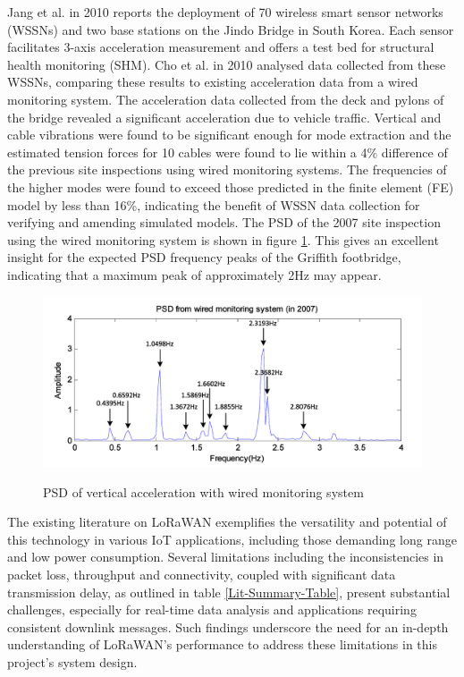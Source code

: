 Jang et al. in 2010 \cite{SHM-Korea} reports the deployment of 70 wireless smart sensor networks (WSSNs) and two base stations on the Jindo Bridge in South Korea. Each sensor facilitates 3-axis acceleration measurement and offers a test bed for structural health monitoring (SHM). Cho et al. in 2010 \cite{WSSN-Korean-Bridge} analysed data collected from these WSSNs, comparing these results to existing acceleration data from a wired monitoring system. The acceleration data collected from the deck and pylons of the bridge revealed a significant acceleration due to vehicle traffic. Vertical and cable vibrations were found to be significant enough for mode extraction and the estimated tension forces for 10 cables were found to lie within a 4\% difference of the previous site inspections using wired monitoring systems. The frequencies of the higher modes were found to exceed those predicted in the finite element (FE) model by less than 16\%, indicating the benefit of WSSN data collection for verifying and amending simulated models. The PSD of the 2007 site inspection using the wired monitoring system is shown in figure \ref{PSD-Wired}. This gives an excellent insight for the expected PSD frequency peaks of the Griffith footbridge, indicating that a maximum peak of approximately 2Hz may appear. 

\begin{figure}[!htb]
	\centering
	\caption{PSD of vertical acceleration with wired monitoring system \cite{WSSN-Korean-Bridge}}
	\includegraphics[scale=0.35]{Sections/Literature-Review/bridge-wired-psd.png}
	\label{PSD-Wired}
\end{figure}

The existing literature on LoRaWAN exemplifies the versatility and potential of this technology in various IoT applications, including those demanding long range and low power consumption. Several limitations including the inconsistencies in packet loss, throughput and connectivity, coupled with significant data transmission delay, as outlined in table \ref{Lit-Summary-Table}, present substantial challenges, especially for real-time data analysis and applications requiring consistent downlink messages. Such findings underscore the need for an in-depth understanding of LoRaWAN's performance to address these limitations in this project's system design. 




